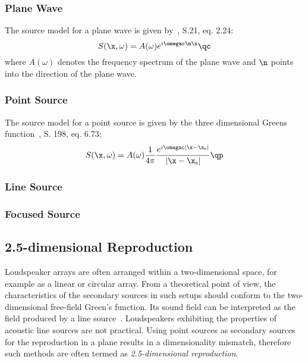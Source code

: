 \documentclass{article}
\begin{document}
\subsubsection{Plane Wave}
\label{sec:planewave}
The source model for a plane wave is given by~\cite{Williams1999}, S.21, eq. 2.24:
%
\begin{equation} 
    S(\x,\omega) = A(\omega) e^{i\omegac \n \x}
    \qc
\end{equation}
%
where $A(\omega)$ denotes the frequency spectrum of the plane
wave and $\n$ points into the direction of the plane wave.

\subsubsection{Point Source}
\label{sec:pointsource}
The source model for a point source is given by the three dimensional Greens
function~\cite{Williams1999}, S. 198, eq. 6.73:
%
\begin{equation}
    S(\x,\omega) = A(\omega) \frac{1}{4\pi}
    \frac{e^{i\omegac|\x-\x_\text{s}|}}{|\x-\x_\text{s}|}
    \qp
\end{equation}

\subsubsection{Line Source}
\label{sec:linesource}

\subsubsection{Focused Source}
\label{sec:focsudedsource}

%
\subsection{2.5-dimensional Reproduction}%
\label{sec:25d_reproduction}%
%
Loudspeaker arrays are often arranged within a two-dimensional space, for example as a
linear or circular array. From a theoretical point of view, the characteristics of the
secondary sources in such setups should conform to the two-dimensional free-field Green's
function. Its sound field can be interpreted as the field produced by a line
source~\cite{Williams1999}. Loudspeakers exhibiting the
properties of acoustic line sources are not practical. Using point
sources as secondary sources for the reproduction in a plane results
in a dimensionality mismatch, therefore such methods are often
termed as {\em 2.5-dimensional reproduction}.
\end{document}
